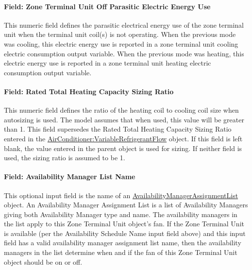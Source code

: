 \paragraph{Field: Zone Terminal Unit Off Parasitic Electric Energy Use}\label{field-zone-terminal-unit-off-parasitic-electric-energy-use-000}

This numeric field defines the parasitic electrical energy use of the zone terminal unit when the terminal unit coil(s) is not operating. When the previous mode was cooling, this electric energy use is reported in a zone terminal unit cooling electric consumption output variable. When the previous mode was heating, this electric energy use is reported in a zone terminal unit heating electric consumption output variable.

\paragraph{Field: Rated Total Heating Capacity Sizing Ratio}\label{field-rated-total-heating-capacity-sizing-ratio-000}

This numeric field defines the ratio of the heating coil to cooling coil size when autosizing is used. The model assumes that when used, this value will be greater than 1. This field supersedes the Rated Total Heating Capacity Sizing Ratio entered in the \hyperref[airconditionervariablerefrigerantflow]{AirConditioner:VariableRefrigerantFlow} object. If this field is left blank, the value entered in the parent object is used for sizing. If neither field is used, the sizing ratio is assumed to be 1.

\paragraph{Field: Availability Manager List Name}\label{field-availability-manager-list-name-10}

This optional input field is the name of an \hyperref[availabilitymanagerassignmentlist]{AvailabilityManagerAssignmentList} object. An Availability Manager Assignment List is a list of Availability Managers giving both Availability Manager type and name. The availability managers in the list apply to this Zone Terminal Unit object's fan. If the Zone Terminal Unit is available (per the Availability Schedule Name input field above) and this input field has a valid availability manager assignment list name, then the availability managers in the list determine when and if the fan of this Zone Terminal Unit object should be on or off.

